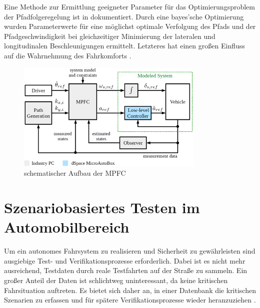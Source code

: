 Eine Methode zur Ermittlung geeigneter Parameter für das Optimierungsproblem der Pfadfolgeregelung ist in \cite{math11020465} dokumentiert. Durch eine bayes'sche Optimierung wurden Parameterwerte für eine möglichst optimale Verfolgung des Pfads und der Pfadgeschwindigkeit bei gleichzeitiger Minimierung der lateralen und longitudinalen Beschleunigungen ermittelt. Letzteres hat einen großen Einfluss auf die Wahrnehmung des Fahrkomforts \cite{BELLEM201890}.
\begin{figure}[H]
    \centering
    \includegraphics[width=0.8\textwidth]{figures/2_Grundlagen/MPFC_Schema.png}
    \caption{schematischer Aufbau der MPFC \cite{ritschel2019}}
    \label{fig:MPFC_Schema}
\end{figure}
    
\section{Szenariobasiertes Testen im Automobilbereich} \label{sec:SoftwaretestsAutomobil}

Um ein autonomes Fahrsystem zu realisieren und Sicherheit zu gewährleisten sind ausgiebige Test- und Verifikationsprozesse erforderlich. Dabei ist es nicht mehr ausreichend, Testdaten durch reale Testfahrten auf der Straße zu sammeln. Ein großer Anteil der Daten ist schlichtweg uninteressant, da keine kritischen Fahrsituation auftreten. Es bietet sich daher an, in einer Datenbank die kritischen Szenarien zu erfassen und für spätere Verifikationsprozesse wieder heranzuziehen \cite{Nalic2020}.

